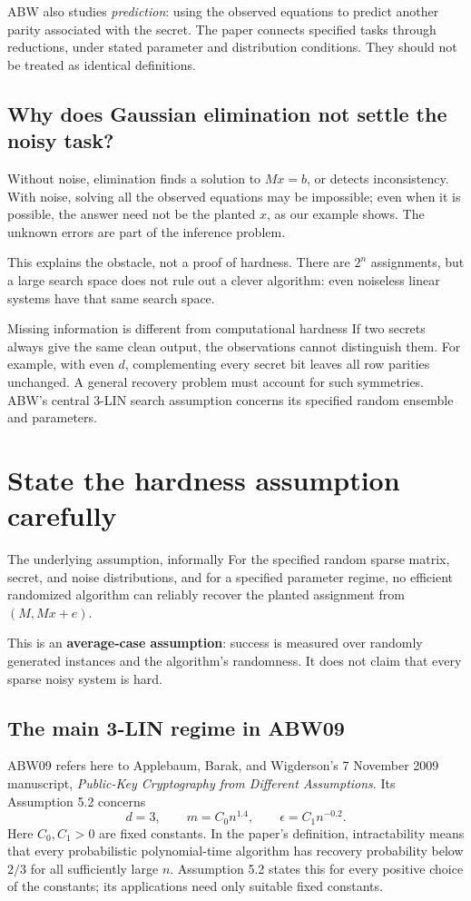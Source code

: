 \documentclass[11pt,a4paper]{article}
\begin{document}
ABW also studies \emph{prediction}: using the observed equations to predict another parity associated with the secret. The paper connects specified tasks through reductions, under stated parameter and distribution conditions. They should not be treated as identical definitions.~\cite{draft2}

\subsection*{Why does Gaussian elimination not settle the noisy task?}
Without noise, elimination finds a solution to $Mx=b$, or detects inconsistency. With noise, solving all the observed equations may be impossible; even when it is possible, the answer need not be the planted $x$, as our example shows. The unknown errors are part of the inference problem.

This explains the obstacle, not a proof of hardness. There are $2^n$ assignments, but a large search space does not rule out a clever algorithm: even noiseless linear systems have that same search space.

\begin{keyidea}{Missing information is different from computational hardness}
If two secrets always give the same clean output, the observations cannot distinguish them. For example, with even $d$, complementing every secret bit leaves all row parities unchanged. A general recovery problem must account for such symmetries. ABW's central 3-LIN search assumption concerns its specified random ensemble and parameters.~\cite{draft2}
\end{keyidea}

\newpage
\section{State the hardness assumption carefully}
\begin{keyidea}{The underlying assumption, informally}
For the specified random sparse matrix, secret, and noise distributions, and for a specified parameter regime, no efficient randomized algorithm can reliably recover the planted assignment from $(M,Mx+e)$.
\end{keyidea}
This is an \textbf{average-case assumption}: success is measured over randomly generated instances and the algorithm's randomness. It does not claim that every sparse noisy system is hard.~\cite{draft2}

\subsection*{The main 3-LIN regime in ABW09}
ABW09 refers here to Applebaum, Barak, and Wigderson's 7 November 2009 manuscript, \emph{Public-Key Cryptography from Different Assumptions}. Its Assumption 5.2 concerns
\[
\boxed{d=3,\qquad m=C_0n^{1.4},\qquad
\epsilon=C_1n^{-0.2}.}
\]
Here $C_0,C_1>0$ are fixed constants. In the paper's definition, intractability means that every probabilistic polynomial-time algorithm has recovery probability below $2/3$ for all sufficiently large $n$. Assumption 5.2 states this for every positive choice of the constants; its applications need only suitable fixed constants.~\cite{abw}
\end{document}
